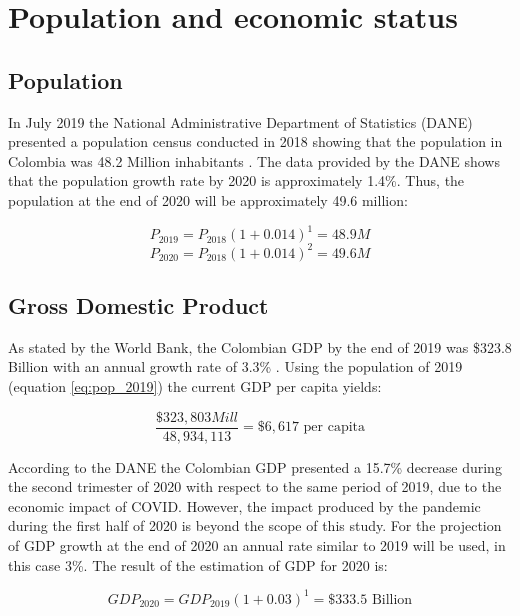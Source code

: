 \documentclass[svn, final]{rureport}
\begin{document}
\section{Population and economic status}

\subsection{Population}

In July 2019 the National Administrative Department of Statistics (DANE) presented a population census conducted in 2018 showing that the population in Colombia was 48.2 Million inhabitants \cite{dane_population_2020}. The data provided by the DANE shows that the population growth rate by 2020 is approximately 1.4\%. Thus, the population at the end of 2020 will be approximately 49.6 million:

\begin{equation}
    P_{2019}=P_{2018}(1+0.014)^{1}=48.9M
    \label{eq:pop_2019}
\end{equation}
\begin{equation}
    P_{2020}=P_{2018}(1+0.014)^{2}=49.6M
    \label{eq:pop_2020}
\end{equation}

\subsection{Gross Domestic Product}

As stated by the World Bank, the Colombian GDP by the end of 2019 was \$323.8 Billion with an annual growth rate of 3.3\% \cite{world_bank_data}. Using the population of 2019 (equation \ref{eq:pop_2019}) the current GDP per capita yields:

\begin{equation}
    \frac{\$323,803Mill}{48,934,113}=\$6,617 \textrm{ per capita}
\end{equation}

According to the DANE the Colombian GDP presented a 15.7\% decrease during the second trimester of 2020 with respect to the same period of 2019, due to the economic impact of COVID. However, the impact produced by the pandemic during the first half of 2020 is beyond the scope of this study. For the projection of GDP growth at the end of 2020 an annual rate similar to 2019 will be used, in this case 3\%. The result of the estimation of GDP for 2020 is:

\begin{equation}
    GDP_{2020}=GDP_{2019}(1+0.03)^{1}=\$333.5 \textrm{ Billion}
    \label{eq:GDP_2020}
\end{equation}
\end{document}
